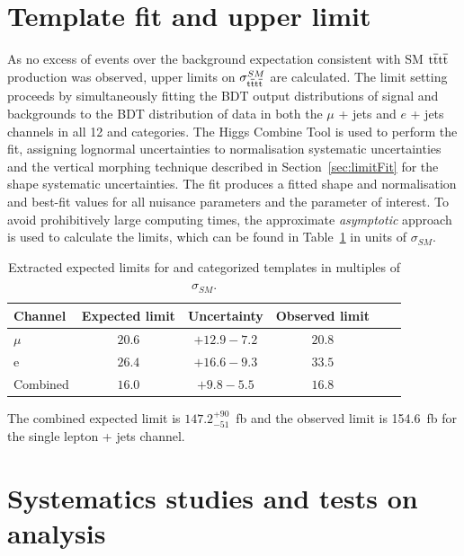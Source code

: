 \section{Template fit and upper limit}
\label{sec:limit13}
As no excess of events over the background expectation consistent with SM $\mathrm{t}\overline{\mathrm{t}}\mathrm{t}\overline{\mathrm{t}}$ production was observed, upper limits on $\sigma_{\mathrm{t}\overline{\mathrm{t}}\mathrm{t}\overline{\mathrm{t}}}^{SM}$ are calculated. 
The limit setting proceeds by simultaneously fitting the BDT output distributions of signal and backgrounds to the BDT distribution of data in both the $\mu$ + jets and $e$ + jets channels in all 12 \njets and \nMtags categories. The Higgs Combine Tool is used to perform the fit, assigning lognormal uncertainties to normalisation systematic uncertainties and the vertical morphing technique described in Section~\ref{sec:limitFit} for the shape systematic uncertainties. The fit produces a fitted shape and normalisation and best-fit values for all nuisance parameters and the parameter of interest. 
To avoid prohibitively large computing times, the approximate \emph{asymptotic} approach is used to calculate the \CLS limits, which can be found in Table~\ref{tab:limits} in units of $\sigma_{SM}$. 

\begin{table}[ht!]
\centering
\begin{tabular}{| l | c | c | c | c | c |}
  \hline
Channel  & Expected limit & Uncertainty & Observed limit\\
 \hline
$\mu$  &$20.6$ & $+12.9 -7.2$ & $20.8$ \\
 \hline
e  &  $26.4$ & $+16.6 -9.3$ & $33.5$ \\
 \hline
 Combined  &  $16.0$ & $+9.8 -5.5$ & $16.8$ \\
 \hline
\end{tabular}
 \caption{Extracted expected limits for \njets and \nMtags categorized templates in multiples of $\sigma_{SM}$.}
  \label{tab:limits}
  \end{table}

The combined expected limit is $147.2^{+90}_{-51}$~fb and the observed limit is 154.6~fb for the single lepton + jets channel.

\section{Systematics studies and tests on analysis}


